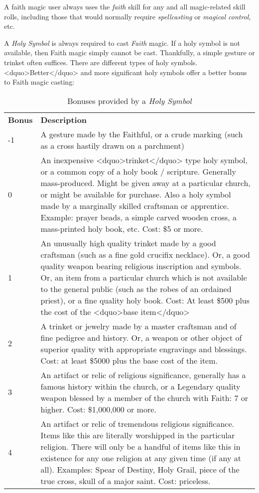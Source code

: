 A faith magic user always uses the \emph{faith} skill for any and all
magic-related skill rolls, including those that would normally require
\emph{spellcasting} or \emph{magical control}, etc.

A \emph{Holy Symbol} is always required to cast \emph{Faith} magic.
If a holy symbol is not available, then Faith magic simply cannot be
cast.  Thankfully, a simple gesture or trinket often suffices.  There
are different types of holy symbols.  <dquo>Better</dquo> and more significant
holy symbols offer a better bonus to Faith magic casting:

\begin{table}[htb]
\begin{center}
\begin{tabular}{p{2em}p{4.5in}}
  \textbf{Bonus} & \textbf{Description} \\
  -1 & A gesture made by the Faithful, or a crude marking (such as a cross hastily drawn on a parchment) \\
  0 & An inexpensive <dquo>trinket</dquo> type holy symbol, or a common copy of a holy book / scripture.  Generally mass-produced.  Might be given away at a particular church, or might be available for purchase.  Also a holy symbol made by a marginally skilled craftsman or apprentice.  Example: prayer beads, a simple carved wooden cross, a mass-printed holy book, etc.  Cost:  \$5 or more. \\
  1 & An unusually high quality trinket made by a good craftsman (such as a fine gold crucifix necklace).  Or, a good quality weapon bearing religious inscription and symbols. Or, an item from a particular church which is not available to the general public (such as the robes of an ordained priest), or a fine quality holy book.  Cost:  At least \$500 plus the cost of the <dquo>base item</dquo> \\
  2 & A trinket or jewelry made by a master craftsman and of fine pedigree and history.  Or, a weapon or other object of superior quality with appropriate engravings and blessings.  Cost: at least \$5000 plus the base cost of the item. \\
  3 & An artifact or relic of religious significance, generally has a famous history within the church, or a Legendary quality weapon blessed by a member of the church with Faith: 7 or higher.  Cost: \$1,000,000 or more. \\
  4 & An artifact or relic of tremendous religious significance.  Items like this are literally worshipped in the particular religion.  There will only be a handful of items like this in existence for any one religion at any given time (if any at all).  Examples:  Spear of Destiny, Holy Grail, piece of the true cross, skull of a major saint. Cost: priceless. \\
\end{tabular}
\caption{Bonuses provided by a \emph{Holy Symbol}}
\end{center}
\end{table}

